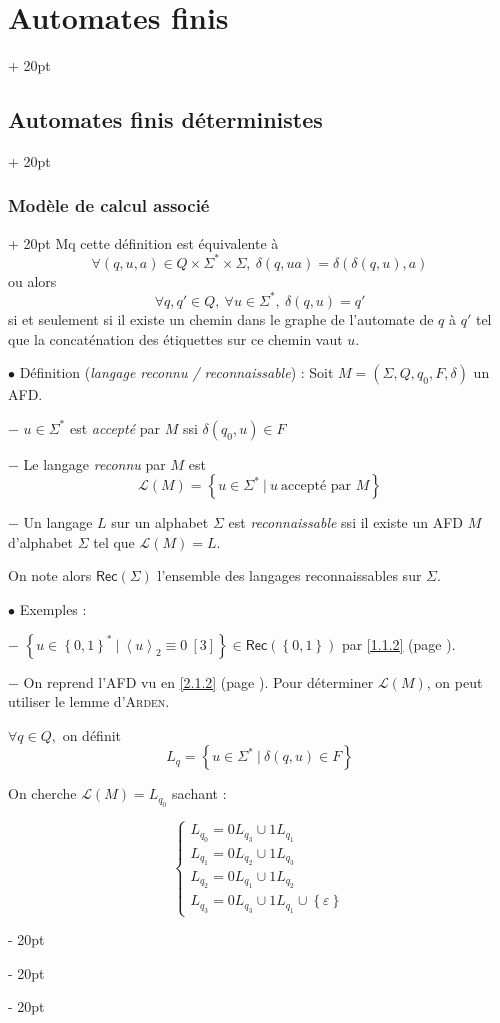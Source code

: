 \documentclass[a4paper, 12pt, twoside]{article}
\newcommand{\lr}[1]{\left( #1 \right)}
\newcommand{\set}[1]{\left\{ #1 \right\}}
\newcommand{\lrangle}[1]{\left\langle #1 \right\rangle}
\newcommand{\ind}[1][20pt]{\advance\leftskip + #1}
\newcommand{\deind}[1][20pt]{\advance\leftskip - #1}
\newenvironment{indt}[2][20pt]{#2 \par \ind[#1]}{\par \deind} %
\newcommand{\Rec}[1]{\mathsf{Rec}\!\lr{#1}}
\begin{document}
\begin{indt}{\section{Automates finis}}
\begin{indt}{\subsection{Automates finis déterministes}}
\begin{indt}{\subsubsection{Modèle de calcul associé}}
                 Mq cette définition est équivalente à
                \[
                    \forall (q, u, a) \in Q \times \Sigma^* \times \Sigma,\
                    \delta(q, ua) = \delta(\delta(q, u), a)
                \]
                ou alors
                \[
                    \forall q, q' \in Q,\ \forall u \in \Sigma ^*,\ \delta(q, u) = q'
                \]
                si et seulement si il existe un chemin dans le graphe de l'automate de $q$ à $q'$ tel que la concaténation des étiquettes sur ce chemin vaut $u$.

                \vspace{12pt}
                
                $\bullet$ Définition (\emph{langage reconnu / reconnaissable}) : Soit $M = (\Sigma, Q, q_0, F, \delta)$ un AFD.

                $-$ $u \in \Sigma ^*$ est \emph{accepté} par $M$ ssi $\delta(q_0, u) \in F$

                $-$ Le langage \emph{reconnu} par $M$ est
                \[
                    \mathcal L(M) = \set{u \in \Sigma^*\ |\ u\ \text{accepté par $M$}}
                \]

                $-$ Un langage $L$ sur un alphabet $\Sigma$ est \emph{reconnaissable} ssi il existe un AFD $M$ d'alphabet $\Sigma$ tel que $\mathcal L(M) = L$.

                On note alors $\Rec \Sigma$ l'ensemble des langages reconnaissables sur $\Sigma$.

                \vspace{12pt}
                
                $\bullet$ Exemples :

                $-$ $\set{u \in \set{0, 1}^*\ |\ \lrangle u _2 \equiv 0\ [3]} \in \Rec{\set{0, 1}}$ par \ref{1.1.2} (page \pageref{1.1.2}).

                $-$ On reprend l'AFD vu en \ref{2.1.2} (page \pageref{2.1.2}).
                Pour déterminer $\mathcal L(M)$, on peut utiliser le lemme d'\textsc{Arden}.

                $\forall q \in Q,$ on définit
                \[
                    L_q = \set{u \in \Sigma^*\ |\ \delta(q, u) \in F}
                \]

                On cherche $\mathcal L(M) = L_{q_0}$ sachant :

                \[
                    \begin{cases}
                        L_{q_0} = 0L_{q_3} \cup 1L_{q_1}
                        \\
                        L_{q_1} = 0L_{q_2} \cup 1L_{q_3}
                        \\
                        L_{q_2} = 0L_{q_1} \cup 1L_{q_2}
                        \\
                        L_{q_3} = 0L_{q_3} \cup 1L_{q_1} \cup \set \varepsilon
                    \end{cases}
                \]


\end{indt}
\end{indt}
\end{indt}
\end{document}
